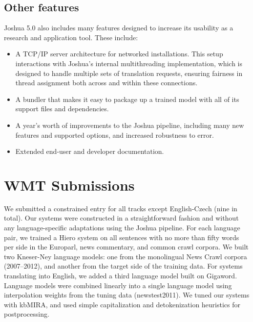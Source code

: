\documentclass[11pt]{article}
\begin{document}
\subsection{Other features}
\label{sec:other}

Joshua 5.0 also includes many features designed to increase its
usability as a research and application tool.  These include:

\begin{itemize}
\item A TCP/IP server architecture for networked installations.  This
  setup interactions with Joshua's internal multithreading
  implementation, which is designed to handle multiple sets of
  translation requests, ensuring fairness in thread assignment both
  across and within these connections.
\item A bundler that makes it easy to package up a trained model with
  all of its support files and dependencies.
\item A year's worth of improvements to the Joshua pipeline, including many
  new features and supported options, and increased robustness to error.
\item Extended end-user and developer documentation.
\end{itemize}


\section{WMT Submissions}

We submitted a constrained entry for all tracks except English-Czech
(nine in total). Our systems were constructed in a straightforward
fashion and without any language-specific adaptations using the Joshua
pipeline. For each language pair, we trained a Hiero system on all
sentences with no more than fifty words per side in the Europarl, news
commentary, and common crawl corpora. We built two Kneser-Ney language
models: one from the monolingual News Crawl corpora (2007--2012), and
another from the target side of the training data.  For systems
translating into English, we added a third language model built on
Gigaword. Language models were combined linearly into a single
language model using interpolation weights from the tuning data
(newstest2011).  We tuned our systems with kbMIRA, and used simple
capitalization and detokenization heuristics for postprocessing.

\end{document}
